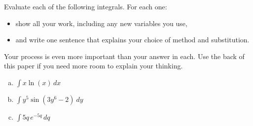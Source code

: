 \hrulefill

Evaluate each of the following integrals. For each one:
\begin{itemize}
	\item show all your work, including any new variables you use,
	\item and write one sentence that explains your choice of method and substitution.
\end{itemize}
Your process is even more important than your answer in each. Use the back of this paper if you need more room to explain your thinking.

\begin{enumerate}[(a)]
	\item $\int x \ln(x)\, dx$
			
	\vfill

	\item $\int y^5 \sin(3y^6-2)\ dy$
	
	\vfill
	
	\item $\int 5q\, e^{-5q} \, dq$
	\vfill
\end{enumerate}

